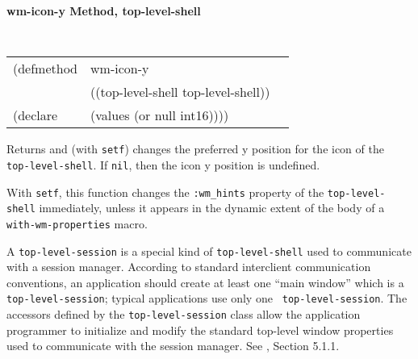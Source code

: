 {\samepage
{\large {\bf wm-icon-y \hfill Method, top-level-shell}}
\begin{flushright} \parbox[t]{6.125in}{
\tt
\begin{tabular}{lll}
\raggedright
(defmethod & wm-icon-y & \\
           & ((top-level-shell  top-level-shell)) \\
(declare   & (values (or null int16))))
\end{tabular}
\rm

}\end{flushright}}

\begin{flushright} \parbox[t]{6.125in}{
Returns and (with {\tt setf}) changes the preferred y position for the icon of the {\tt
top-level-shell}. If {\tt nil}, then the icon y position is
undefined.

With {\tt setf}, this function changes the {\tt :wm\_hints} property of
the {\tt top-level-shell} immediately, unless it appears in the dynamic extent of the
body of a {\tt with-wm-properties} macro.


}\end{flushright}


A {\tt top-level-session} is a special kind of {\tt top-level-shell} used
to communicate with a session manager. 
According
to standard interclient communication conventions\cite{icccm}, an
application should create at least one ``main window'' which is a
{\tt top-level-session}; typical applications use only one {\tt
top-level-session}.
The accessors defined by the {\tt top-level-session} class allow
the application programmer to initialize and modify the standard
top-level window properties used to communicate with the session
manager. See \cite{icccm}, Section 5.1.1.

